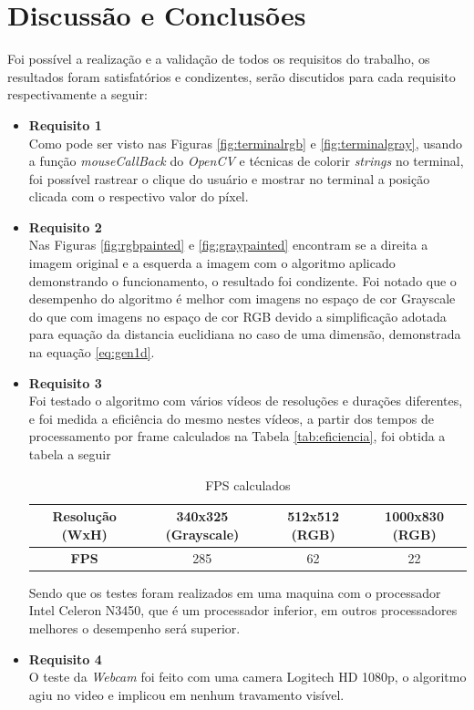 \documentclass{bmvc2k}
\begin{document}
\section{Discussão e Conclusões}
    Foi possível a realização e a validação de todos os requisitos do trabalho, os resultados foram satisfatórios e condizentes, serão discutidos para cada requisito respectivamente a seguir:
    \begin{itemize}
        \item \textbf{Requisito 1}\\
            Como pode ser visto nas Figuras \ref{fig:terminalrgb} e \ref{fig:terminalgray}, usando a função \textit{mouseCallBack} do \textit{OpenCV} e técnicas de colorir \textit{strings} no terminal, foi possível rastrear o clique do usuário e mostrar no terminal a posição clicada com o respectivo valor do píxel.
        \item \textbf{Requisito 2}\\
            Nas Figuras \ref{fig:rgbpainted} e \ref{fig:graypainted} encontram se a direita a imagem original e a esquerda a imagem com o algoritmo aplicado demonstrando o funcionamento, o resultado foi condizente. Foi notado que o desempenho do algoritmo é melhor com imagens no espaço de cor Grayscale do que com imagens no espaço de cor RGB devido a simplificação adotada para equação da distancia euclidiana no caso de uma dimensão, demonstrada na equação \ref{eq:gen1d}.
        \item \textbf{Requisito 3}\\
            Foi testado o algoritmo com vários vídeos de resoluções e durações diferentes, e foi medida a eficiência do mesmo nestes vídeos, a partir dos tempos de processamento por frame calculados na Tabela \ref{tab:eficiencia}, foi obtida a tabela a seguir
            \begin{table}[!ht]
                \centering
                \begin{tabular}{|c|c|c|c|}
                    \hline
                    \textbf{Resolução (WxH)} & 340x325 (Grayscale) & 512x512 (RGB) & 1000x830 (RGB)  \\ \hline
                    \textbf{FPS}       &    285     &    62     &      22     \\ \hline
                \end{tabular}
                \vspace{2mm}
                \caption{FPS calculados}
                \label{tab:fps}
            \end{table}
            Sendo que os testes foram realizados em uma maquina com o processador Intel Celeron N3450, que é um processador inferior, em outros processadores melhores o desempenho será superior.
        \item \textbf{Requisito 4}\\
            O teste da \textit{Webcam} foi feito com uma camera Logitech HD 1080p, o algoritmo agiu no video e implicou em nenhum travamento visível.
    \end{itemize}


\newpage

\end{document}

